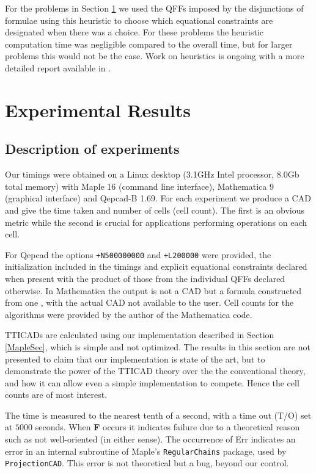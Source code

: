 \documentclass{article}
\begin{document}
For the problems in Section \ref{sec:Experiment} we used the QFFs imposed by the disjunctions of formulae using this heuristic to choose which equational constraints are designated when there was a choice. For these problems the heuristic computation time was negligible compared to the overall time, but for larger problems this would not be the case.  Work on heuristics is ongoing with a more detailed report available in \cite{BDEW13}. 







\section{Experimental Results}
\label{sec:Experiment}

\subsection{Description of experiments}

Our timings were obtained on a Linux desktop (3.1GHz Intel processor, 8.0Gb total memory) with {\sc Maple} 16 (command line interface), {\sc Mathematica} 9 (graphical interface) and {\sc Qepcad-B} 1.69.  
For each experiment we produce a CAD and give the time taken and number of cells (cell count). The first is an obvious metric while the second is crucial for applications performing operations on each cell.  

For {\sc Qepcad} the options {\tt +N500000000} and {\tt +L200000} were provided, the initialization included in the timings and explicit equational constraints declared when present with the product of those from the individual QFFs declared otherwise.  
In {\sc Mathematica} the output is not a CAD but a formula constructed from one \cite{Strzebonski10}, with the actual CAD not available to the user.  Cell counts for the algorithms were provided by the author of the {\sc Mathematica} code. 

TTICADs are calculated using our implementation described in Section \ref{MapleSec}, which is simple and not optimized.  The results in this section are not presented to claim that our implementation is state of the art, but to demonstrate the power of the TTICAD theory over the the conventional theory, and how it can allow even a simple implementation to compete.  Hence the cell counts are of most interest.

The time is measured to the nearest tenth of a second, with a time out (T/O) set at $5000$ seconds.   When {\bf F} occurs it indicates failure due to a theoretical reason such as not well-oriented (in either sense).  The occurrence  of Err indicates an error in an internal subroutine of {\sc Maple}'s \texttt{RegularChains} package, used by \texttt{ProjectionCAD}.  This error is not theoretical but a bug, 
beyond our control. 
\end{document}
